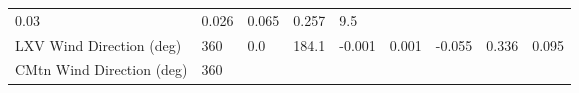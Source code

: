 \documentclass[11pt]{article}
\begin{document}
\begin{longtable}[]{@{}lllllllll@{}}
\begin{minipage}[t]{0.05\columnwidth}
0.03\strut
\end{minipage} & \begin{minipage}[t]{0.07\columnwidth}\raggedright\strut
0.026\strut
\end{minipage} & \begin{minipage}[t]{0.06\columnwidth}\raggedright\strut
0.065\strut
\end{minipage} & \begin{minipage}[t]{0.06\columnwidth}\raggedright\strut
0.257\strut
\end{minipage} & \begin{minipage}[t]{0.07\columnwidth}\raggedright\strut
9.5\strut
\end{minipage}\tabularnewline
\begin{minipage}[t]{0.25\columnwidth}\raggedright\strut
LXV Wind Direction (deg)\strut
\end{minipage} & \begin{minipage}[t]{0.06\columnwidth}\raggedright\strut
360\strut
\end{minipage} & \begin{minipage}[t]{0.06\columnwidth}\raggedright\strut
0.0\strut
\end{minipage} & \begin{minipage}[t]{0.08\columnwidth}\raggedright\strut
184.1\strut
\end{minipage} & \begin{minipage}[t]{0.05\columnwidth}\raggedright\strut
-0.001\strut
\end{minipage} & \begin{minipage}[t]{0.07\columnwidth}\raggedright\strut
0.001\strut
\end{minipage} & \begin{minipage}[t]{0.06\columnwidth}\raggedright\strut
-0.055\strut
\end{minipage} & \begin{minipage}[t]{0.06\columnwidth}\raggedright\strut
0.336\strut
\end{minipage} & \begin{minipage}[t]{0.07\columnwidth}\raggedright\strut
0.095\strut
\end{minipage}\tabularnewline
\begin{minipage}[t]{0.25\columnwidth}\raggedright\strut
CMtn Wind Direction (deg)\strut
\end{minipage} & \begin{minipage}[t]{0.06\columnwidth}\raggedright\strut
360\strut
\end{minipage} & \begin{minipage}[t]{0.06\columnwidth}\raggedright\strut

\end{minipage}
\end{longtable}
\end{document}
